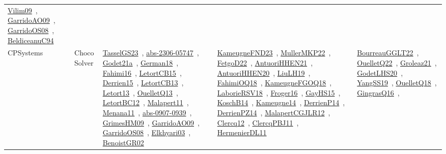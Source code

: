 {\begin{longtable}{lp{3cm}>{\raggedright\arraybackslash}p{6cm}>{\raggedright\arraybackslash}p{6cm}>{\raggedright\arraybackslash}p{8cm}}
\href{../works/Vilim09.pdf}{Vilim09}~\cite{Vilim09}, \href{../works/GarridoAO09.pdf}{GarridoAO09}~\cite{GarridoAO09}, \href{../works/GarridoOS08.pdf}{GarridoOS08}~\cite{GarridoOS08}, \href{../works/BeldiceanuC94.pdf}{BeldiceanuC94}~\cite{BeldiceanuC94}\\
CPSystems & Choco Solver & \href{../works/TasselGS23.pdf}{TasselGS23}~\cite{TasselGS23}, \href{../works/abs-2306-05747.pdf}{abs-2306-05747}~\cite{abs-2306-05747}, \href{../works/Godet21a.pdf}{Godet21a}~\cite{Godet21a}, \href{../works/German18.pdf}{German18}~\cite{German18}, \href{../works/Fahimi16.pdf}{Fahimi16}~\cite{Fahimi16}, \href{../works/LetortCB15.pdf}{LetortCB15}~\cite{LetortCB15}, \href{../works/Derrien15.pdf}{Derrien15}~\cite{Derrien15}, \href{../works/LetortCB13.pdf}{LetortCB13}~\cite{LetortCB13}, \href{../works/Letort13.pdf}{Letort13}~\cite{Letort13}, \href{../works/OuelletQ13.pdf}{OuelletQ13}~\cite{OuelletQ13}, \href{../works/LetortBC12.pdf}{LetortBC12}~\cite{LetortBC12}, \href{../works/Malapert11.pdf}{Malapert11}~\cite{Malapert11}, \href{../works/Menana11.pdf}{Menana11}~\cite{Menana11}, \href{../works/abs-0907-0939.pdf}{abs-0907-0939}~\cite{abs-0907-0939}, \href{../works/GrimesHM09.pdf}{GrimesHM09}~\cite{GrimesHM09}, \href{../works/GarridoAO09.pdf}{GarridoAO09}~\cite{GarridoAO09}, \href{../works/GarridoOS08.pdf}{GarridoOS08}~\cite{GarridoOS08}, \href{../works/Elkhyari03.pdf}{Elkhyari03}~\cite{Elkhyari03}, \href{../works/BenoistGR02.pdf}{BenoistGR02}~\cite{BenoistGR02} & \href{../works/KameugneFND23.pdf}{KameugneFND23}~\cite{KameugneFND23}, \href{../works/MullerMKP22.pdf}{MullerMKP22}~\cite{MullerMKP22}, \href{../works/FetgoD22.pdf}{FetgoD22}~\cite{FetgoD22}, \href{../works/AntuoriHHEN21.pdf}{AntuoriHHEN21}~\cite{AntuoriHHEN21}, \href{../works/AntuoriHHEN20.pdf}{AntuoriHHEN20}~\cite{AntuoriHHEN20}, \href{../works/LiuLH19.pdf}{LiuLH19}~\cite{LiuLH19}, \href{../works/FahimiOQ18.pdf}{FahimiOQ18}~\cite{FahimiOQ18}, \href{../works/KameugneFGOQ18.pdf}{KameugneFGOQ18}~\cite{KameugneFGOQ18}, \href{../works/LaborieRSV18.pdf}{LaborieRSV18}~\cite{LaborieRSV18}, \href{../works/Froger16.pdf}{Froger16}~\cite{Froger16}, \href{../works/GayHS15.pdf}{GayHS15}~\cite{GayHS15}, \href{../works/KoschB14.pdf}{KoschB14}~\cite{KoschB14}, \href{../works/Kameugne14.pdf}{Kameugne14}~\cite{Kameugne14}, \href{../works/DerrienP14.pdf}{DerrienP14}~\cite{DerrienP14}, \href{../works/DerrienPZ14.pdf}{DerrienPZ14}~\cite{DerrienPZ14}, \href{../works/MalapertCGJLR12.pdf}{MalapertCGJLR12}~\cite{MalapertCGJLR12}, \href{../works/Clercq12.pdf}{Clercq12}~\cite{Clercq12}, \href{../works/ClercqPBJ11.pdf}{ClercqPBJ11}~\cite{ClercqPBJ11}, \href{../works/HermenierDL11.pdf}{HermenierDL11}~\cite{HermenierDL11} & \href{../works/BourreauGGLT22.pdf}{BourreauGGLT22}~\cite{BourreauGGLT22}, \href{../works/OuelletQ22.pdf}{OuelletQ22}~\cite{OuelletQ22}, \href{../works/Groleaz21.pdf}{Groleaz21}~\cite{Groleaz21}, \href{../works/GodetLHS20.pdf}{GodetLHS20}~\cite{GodetLHS20}, \href{../works/YangSS19.pdf}{YangSS19}~\cite{YangSS19}, \href{../works/OuelletQ18.pdf}{OuelletQ18}~\cite{OuelletQ18}, \href{../works/GingrasQ16.pdf}{GingrasQ16}~\cite{GingrasQ16}, 
\end{longtable}}
